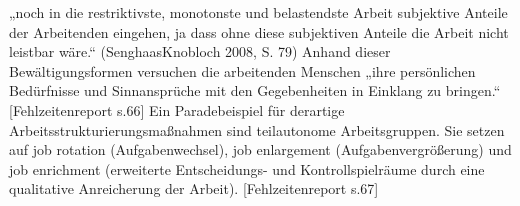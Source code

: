 „noch in die restriktivste, monotonste und belastendste Arbeit subjektive Anteile der Arbeitenden eingehen, ja dass ohne diese subjektiven Anteile die Arbeit nicht leistbar wäre.“ (SenghaasKnobloch 2008, S. 79) Anhand dieser Bewältigungsformen versuchen die arbeitenden Menschen „ihre persönlichen Bedürfnisse und Sinnansprüche mit den Gegebenheiten in Einklang zu bringen.“
[Fehlzeitenreport s.66]
Ein Paradebeispiel für derartige Arbeitsstrukturierungsmaßnahmen sind teilautonome Arbeitsgruppen. Sie setzen auf job rotation (Aufgabenwechsel), job enlargement (Aufgabenvergrößerung) und job enrichment (erweiterte Entscheidungs- und Kontrollspielräume durch eine qualitative Anreicherung der Arbeit). [Fehlzeitenreport s.67]

